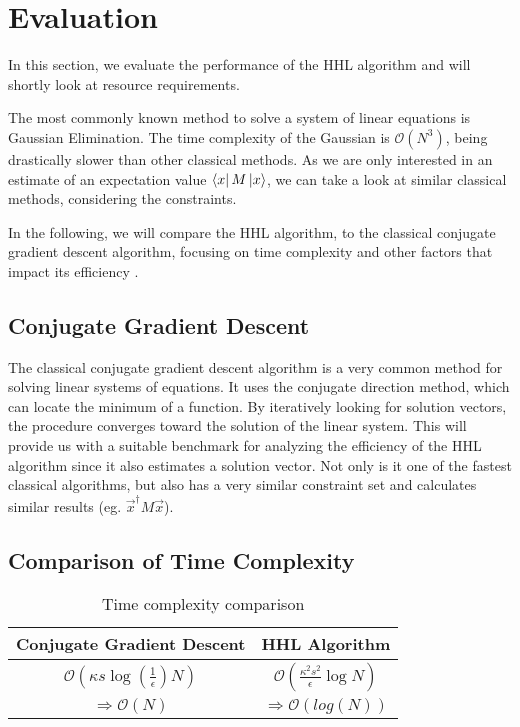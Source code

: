 \section{Evaluation}

\begin{comment}
look at gauß verfahren 
not fastest
look at same constraints 
conjugate gradient descent much faster with similiar requirements
only interested in estimate of $\vec{x}^\dagger M \vec x$
this runs in $ \mathcal{O}(\kappa s log{\left(\frac 1 \epsilon\right)} N ) $
where 
\end{comment}

In this section, we evaluate the performance of the HHL algorithm and will shortly look at resource requirements.

The most commonly known method to solve a system of linear equations is Gaussian Elimination. 
The time complexity of the Gaussian is $\mathcal{O} (N^3)$, being drastically slower than other classical methods.
As we are only interested in an estimate of an expectation value $\bra x M \ket x$, we can take a look at similar classical methods, considering the constraints.

In the following, we will compare the HHL algorithm, to the classical conjugate gradient descent algorithm, focusing on time complexity and other factors that impact its efficiency \cite{hhl}.

\subsection{Conjugate Gradient Descent}
The classical conjugate gradient descent algorithm is a very common method for solving linear systems of equations. 
It uses the conjugate direction method, which can locate the minimum of a function. 
By iteratively looking for solution vectors, the procedure converges toward the solution of the linear system.
This will provide us with a suitable benchmark for analyzing the efficiency of the HHL algorithm since it also estimates a solution vector.
Not only is it one of the fastest classical algorithms, but also has a very similar constraint set and calculates similar results (eg. $\vec{x}^\dagger M \vec x$).

\subsection{Comparison of Time Complexity }
\begin{table}[htbp]
    \caption{Time complexity comparison}
    \begin{center}
    \begin{tabular}{|c|c|}
    \hline
    \textbf{Conjugate Gradient Descent} & \textbf{HHL Algorithm} \\
    \hline
    $\mathcal{O}(\kappa s \log\left(\frac{1}{\epsilon}\right) N)$  &  $\mathcal{O}\left(\frac{\kappa^2s^2}{\epsilon}\log N\right)$\\
    \hline
    $\Rightarrow \mathcal{O} (N)$ & $\Rightarrow \mathcal{O} (log(N))$\\ 
    \hline
    \end{tabular}
    \end{center}
\end{table}

